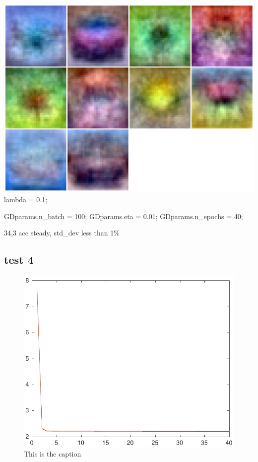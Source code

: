 \documentclass[]{article}
\begin{document}
\includegraphics{../Result_Pics/b100e40eta01la_1proto.pdf} lambda = 0.1;

GDparams.n\_batch = 100; GDparams.eta = 0.01; GDparams.n\_epochs = 40;

34,3 acc steady, std\_dev less than 1\%

\subsection{test 4}\label{test-4}

\begin{figure}[h]
\centering
\includegraphics{../Result_Pics/b100e40eta01la1_.pdf}
\caption{This is the caption}
\end{figure}
\end{document}
